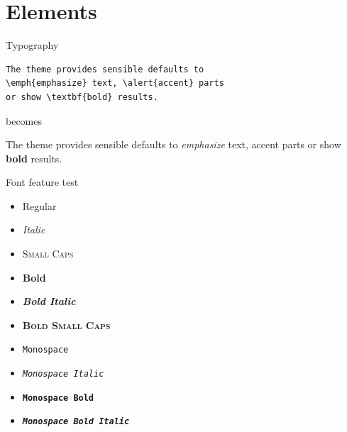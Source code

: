\documentclass[10pt]{beamer}
\begin{document}
\section{Elements}

\begin{frame}[fragile]{Typography}
      \begin{verbatim}The theme provides sensible defaults to
\emph{emphasize} text, \alert{accent} parts
or show \textbf{bold} results.\end{verbatim}

  \begin{center}becomes\end{center}

  The theme provides sensible defaults to \emph{emphasize} text,
  \alert{accent} parts or show \textbf{bold} results.
\end{frame}

\begin{frame}{Font feature test}
  \begin{itemize}
    \item Regular
    \item \textit{Italic}
    \item \textsc{Small Caps}
    \item \textbf{Bold}
    \item \textbf{\textit{Bold Italic}}
    \item \textbf{\textsc{Bold Small Caps}}
    \item \texttt{Monospace}
    \item \texttt{\textit{Monospace Italic}}
    \item \texttt{\textbf{Monospace Bold}}
    \item \texttt{\textbf{\textit{Monospace Bold Italic}}}
  \end{itemize}
\end{frame}
\end{document}

